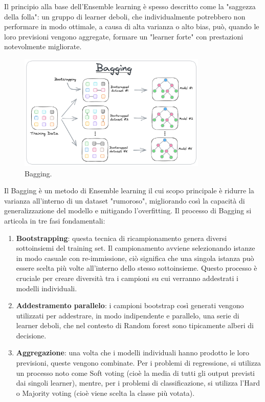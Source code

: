 \documentclass[a4paper,12pt]{report}
\begin{document}
	Il principio alla base dell'Ensemble learning è spesso descritto come la "saggezza della folla": un gruppo di learner deboli, che individualmente potrebbero non performare in modo ottimale, a causa di alta varianza o alto bias, può, quando le loro previsioni vengono aggregate, formare un "learner forte" con prestazioni notevolmente migliorate. \\
	\begin{figure}[H]
		\centering
		\includegraphics[width=0.8\textwidth]{img/bagging.png}
		\caption{Bagging.}
	\end{figure}
	Il Bagging è un metodo di Ensemble learning il cui scopo principale è ridurre la varianza all'interno di un dataset "rumoroso", migliorando così la capacità di generalizzazione del modello e mitigando l'overfitting. Il processo di Bagging si articola in tre fasi fondamentali:
	\begin{enumerate}
		\item \textbf{Bootstrapping}: questa tecnica di ricampionamento genera diversi sottoinsiemi del training set. Il campionamento avviene selezionando istanze in modo casuale con re-immissione, ciò significa che una singola istanza può essere scelta più volte all'interno dello stesso sottoinsieme. Questo processo è cruciale per creare diversità tra i campioni su cui verranno addestrati i modelli individuali.
		\item \textbf{Addestramento parallelo}: i campioni bootstrap così generati vengono utilizzati per addestrare, in modo indipendente e parallelo, una serie di learner deboli, che nel contesto di Random forest sono tipicamente alberi di decisione.
		\item \textbf{Aggregazione}: una volta che i modelli individuali hanno prodotto le loro previsioni, queste vengono combinate. Per i problemi di regressione, si utilizza un processo noto come Soft voting (cioè la media di tutti gli output previsti dai singoli learner), mentre, per i problemi di classificazione, si utilizza l'Hard o Majority voting (cioè viene scelta la classe più votata).
	\end{enumerate}
	
\end{document}
